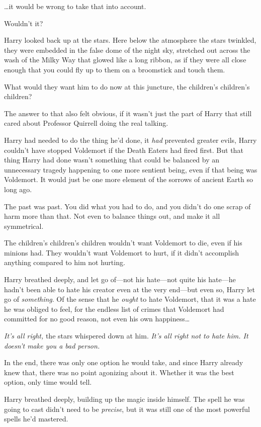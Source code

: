 {\ldots}it would be wrong to take that into account.

Wouldn't it?

Harry looked back up at the stars. Here below the atmosphere the stars twinkled, they were embedded in the false dome of the night sky, stretched out across the wash of the Milky Way that glowed like a long ribbon, as if they were all close enough that you could fly up to them on a broomstick and touch them.

What would they want him to do now at this juncture, the children's children's children?

The answer to that also felt obvious, if it wasn't just the part of Harry that still cared about Professor Quirrell doing the real talking.

Harry had needed to do the thing he'd done, it \emph{had} prevented greater evils, Harry couldn't have stopped Voldemort if the Death Eaters had fired first. But that thing Harry had done wasn't something that could be balanced by an unnecessary tragedy happening to one more sentient being, even if that being was Voldemort. It would just be one more element of the sorrows of ancient Earth so long ago.

The past was past. You did what you had to do, and you didn't do one scrap of harm more than that. Not even to balance things out, and make it all symmetrical.

The children's children's children wouldn't want Voldemort to die, even if his minions had. They wouldn't want Voldemort to hurt, if it didn't accomplish anything compared to him not hurting.

Harry breathed deeply, and let go of—not his hate—not quite his hate—he hadn't been able to hate his creator even at the very end—but even so, Harry let go of \emph{something}. Of the sense that he \emph{ought} to hate Voldemort, that it was a hate he was obliged to feel, for the endless list of crimes that Voldemort had committed for no good reason, not even his own happiness{\ldots}

\emph{It's all right,} the stars whispered down at him. \emph{It's all right not to hate him. It doesn't make you a bad person.}

In the end, there was only one option he would take, and since Harry already knew that, there was no point agonizing about it. Whether it was the best option, only time would tell.

Harry breathed deeply, building up the magic inside himself. The spell he was going to cast didn't need to be \emph{precise}, but it was still one of the most powerful spells he'd mastered.

